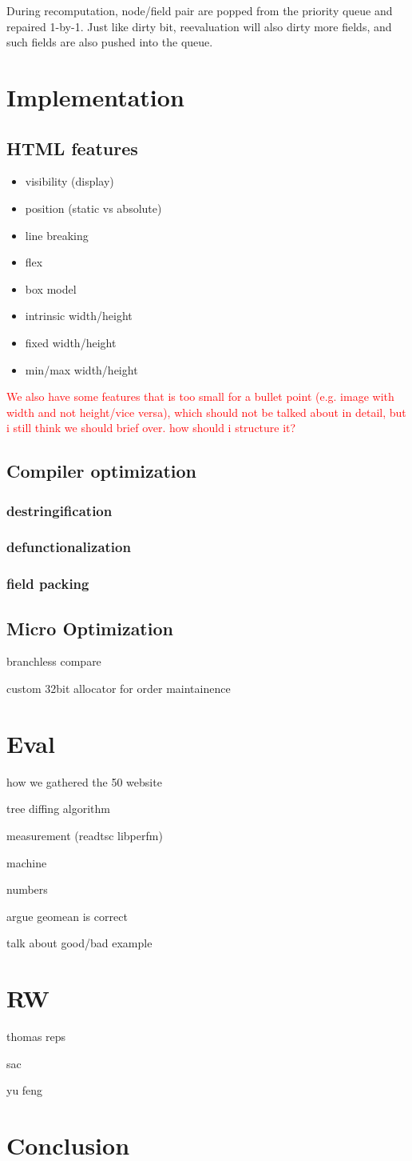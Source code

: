 \documentclass[format=acmsmall, review=false, screen=true]{acmart}
\newcommand\todo[1]{\textcolor{red}{#1}}
\begin{document}
During recomputation, node/field pair are popped from the priority queue and repaired 1-by-1. Just like dirty bit, reevaluation will also dirty more fields, and such fields are also pushed into the queue.

\section{Implementation}
\subsection{HTML features}
\begin{itemize}
	\item visibility (display)
	\item position (static vs absolute)
	\item line breaking
	\item flex
	\item box model
	\item intrinsic width/height
	\item fixed width/height
	\item min/max width/height
\end{itemize}
\todo{We also have some features that is too small for a bullet point (e.g. image with width and not height/vice versa), which should not be talked about in detail, but i still think we should brief over. how should i structure it?}
\subsection{Compiler optimization}
\subsubsection{destringification}
\subsubsection{defunctionalization}
\subsubsection{field packing}
\subsection{Micro Optimization}
branchless compare

custom 32bit allocator for order maintainence

\section{Eval}
how we gathered the 50 website

tree diffing algorithm

measurement (readtsc libperfm)

machine

numbers

argue geomean is correct

talk about good/bad example
\section{RW}
thomas reps

sac

yu feng
\section{Conclusion}
\end{document}
